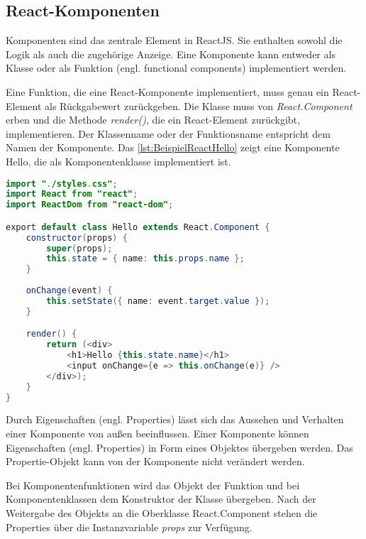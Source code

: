 \subsection{React-Komponenten}\label{sec:reactKomponenten}


Komponenten sind das zentrale Element in ReactJS. Sie enthalten sowohl die Logik als auch die zugehörige Anzeige. Eine Komponente kann entweder als Klasse oder als Funktion (engl. functional components) implementiert werden. 

Eine Funktion, die eine React-Komponente implementiert, muss genau ein React-Element als Rückgabewert zurückgeben. Die Klasse muss von \textit{React.Component} erben und die Methode \textit{render()}, die ein React-Element zurückgibt, implementieren. Der Klassenname oder der Funktionsname entspricht dem Namen der Komponente.\autocite[vgl.][80\psqq]{Zeigermann.2016} Das \autoref{lst:BeispielReactHello} zeigt eine Komponente Hello, die als Komponentenklasse implementiert ist. 


\begin{lstlisting}[caption=Beispiel React-Anwendung: Die Komponente Hello, label=lst:BeispielReactHello, language=Java]
import "./styles.css";
import React from "react";
import ReactDom from "react-dom";

export default class Hello extends React.Component {
	constructor(props) {
		super(props);
		this.state = { name: this.props.name };
	}
	
	onChange(event) {
		this.setState({ name: event.target.value });
	}

	render() {
		return (<div>
			<h1>Hello {this.state.name}</h1>
			<input onChange={e => this.onChange(e)} />
		</div>);
	}
}
\end{lstlisting}

Durch Eigenschaften (engl. Properties) lässt sich das Aussehen und Verhalten einer Komponente von außen beeinflussen. Einer Komponente können Eigenschaften (engl. Properties) in Form eines Objektes übergeben werden. Das Propertie-Objekt kann von der Komponente nicht verändert werden. 

Bei Komponentenfunktionen wird das Objekt der Funktion und bei Komponentenklassen dem Konstruktor der Klasse übergeben. Nach der Weitergabe des Objekts an die Oberklasse React.Component stehen die Properties über die Instanzvariable \textit{props} zur Verfügung. \autocites[vgl.][24\psq,83-88]{Zeigermann.2016}[vgl.][12-17]{Stefanov.2017}

